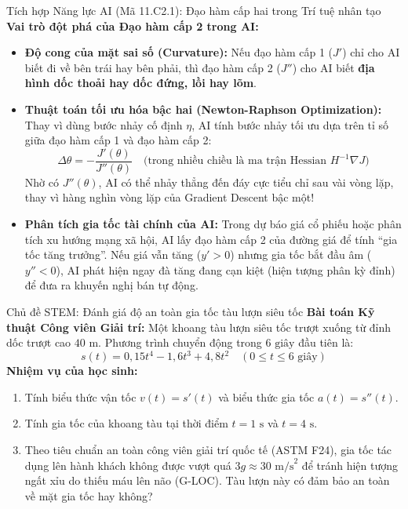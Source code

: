 \documentclass[12pt, a4paper]{article}
\begin{document}
\begin{aibox}{Tích hợp Năng lực AI (Mã 11.C2.1): Đạo hàm cấp hai trong Trí tuệ nhân tạo}
\textbf{Vai trò đột phá của Đạo hàm cấp 2 trong AI:}
\begin{itemize}[leftmargin=0.5cm]
    \item \textbf{Độ cong của mặt sai số (Curvature):} Nếu đạo hàm cấp 1 ($J'$) chỉ cho AI biết đi về bên trái hay bên phải, thì đạo hàm cấp 2 ($J''$) cho AI biết \textbf{địa hình dốc thoải hay dốc đứng, lồi hay lõm}.
    \item \textbf{Thuật toán tối ưu hóa bậc hai (Newton-Raphson Optimization):}
    Thay vì dùng bước nhảy cố định $\eta$, AI tính bước nhảy tối ưu dựa trên tỉ số giữa đạo hàm cấp 1 và đạo hàm cấp 2:
    \begin{equation}
        \Delta \theta = -\dfrac{J'(\theta)}{J''(\theta)} \quad \text{(trong nhiều chiều là ma trận Hessian $H^{-1} \nabla J$)}
    \end{equation}
    Nhờ có $J''(\theta)$, AI có thể nhảy thẳng đến đáy cực tiểu chỉ sau vài vòng lặp, thay vì hàng nghìn vòng lặp của Gradient Descent bậc một!
    \item \textbf{Phân tích gia tốc tài chính của AI:} Trong dự báo giá cổ phiếu hoặc phân tích xu hướng mạng xã hội, AI lấy đạo hàm cấp 2 của đường giá để tính ``gia tốc tăng trưởng''. Nếu giá vẫn tăng ($y' > 0$) nhưng gia tốc bắt đầu âm ($y'' < 0$), AI phát hiện ngay đà tăng đang cạn kiệt (hiện tượng phân kỳ đỉnh) để đưa ra khuyến nghị bán tự động.
\end{itemize}
\end{aibox}

\begin{stembox}{Chủ đề STEM: Đánh giá độ an toàn gia tốc tàu lượn siêu tốc}
\textbf{Bài toán Kỹ thuật Công viên Giải trí:} Một khoang tàu lượn siêu tốc trượt xuống từ đỉnh dốc trượt cao $40\text{ m}$. Phương trình chuyển động trong $6\text{ giây}$ đầu tiên là:
$$s(t) = 0{,}15 t^4 - 1{,}6 t^3 + 4{,}8 t^2 \quad (0 \leq t \leq 6\text{ giây})$$
\textbf{Nhiệm vụ của học sinh:}
\begin{enumerate}[leftmargin=0.6cm]
    \item Tính biểu thức vận tốc $v(t) = s'(t)$ và biểu thức gia tốc $a(t) = s''(t)$.
    \item Tính gia tốc của khoang tàu tại thời điểm $t = 1\text{ s}$ và $t = 4\text{ s}$.
    \item Theo tiêu chuẩn an toàn công viên giải trí quốc tế (ASTM F24), gia tốc tác dụng lên hành khách không được vượt quá $3g \approx 30\text{ m/s}^2$ để tránh hiện tượng ngất xỉu do thiếu máu lên não (G-LOC). Tàu lượn này có đảm bảo an toàn về mặt gia tốc hay không?
\end{enumerate}
\end{stembox}
\end{document}
